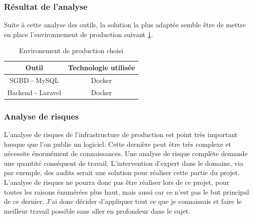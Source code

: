 \documentclass[
    iai, %
    il, %
]{heig-tb}
\begin{document}

\subsubsection{Résultat de l'analyse}
Suite à cette analyse des outils, la solution la plus adaptée semble être de mettre en place
l'environnement de production suivant \ref{env-prod}.

\begin{table}[h]
    \begin{center}
        \caption{Environement de production choisi \label{env-prod}}
        \begin{tabular}{c|c}
            Outil             & Technologie utilisée \\ \hline
            SGBD - MySQL      & Docker               \\
            Backend - Laravel & Docker               \\
        \end{tabular}
    \end{center}
\end{table}

\subsubsection{Analyse de risques}

L'analyse de risques de l'infrastructure de production est point très important lorsque que l'on publie un logiciel. Cette dernière peut être très complexe et nécessite énormément de connaissances.
Une analyse de risque complète demande une quantité conséquent de travail. L'intervention d'expert dans le domaine, via par exemple, des audits serait une solution pour réaliser cette partie du projet.\newline
L'analyse de risques ne pourra donc pas être réaliser lors de ce projet, pour toutes les raisons énumérées plus haut, mais aussi car ce n'est pas le but principal de ce dernier.\newline
J'ai donc décider d'appliquer tout ce que je connaissais et faire le meilleur travail possible sans aller en profondeur dans le sujet.
\end{document}
